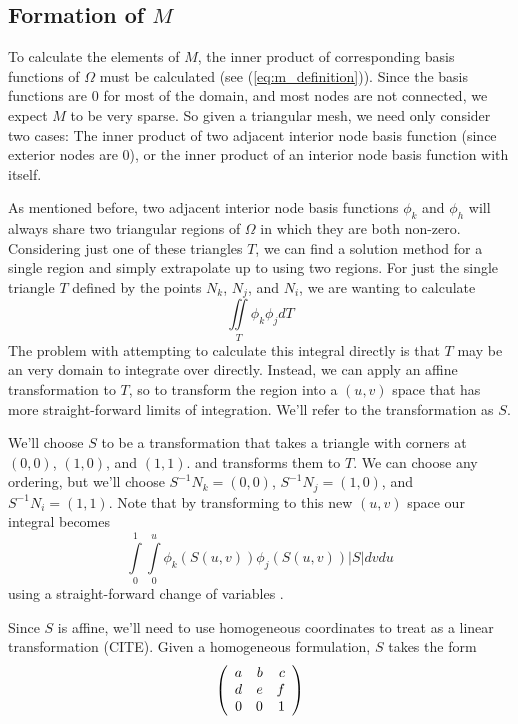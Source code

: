 \subsection{Formation of $M$}
To calculate the elements of $M$, the inner product of corresponding basis functions of $\Omega$ must be calculated
(see (\ref{eq:m_definition})). Since the basis functions are 0 for most of the domain, and most nodes are not
connected, we expect $M$ to be very sparse. So given a triangular mesh, we need only consider two cases: The inner
product of two adjacent interior node basis function (since exterior nodes are 0), or the inner product of an interior
node basis function with itself.

As mentioned before, two adjacent interior node basis functions $\phi_k$ and $\phi_h$ will always share two triangular
regions of $\Omega$ in which they are both non-zero. Considering just one of these triangles $T$, we can find a solution method for a
single region and simply extrapolate up to using two regions. For just the single triangle $T$ defined by the points
$N_k$, $N_j$, and $N_i$, we are wanting to calculate
\begin{equation}
\iint\limits_T \phi_k \phi_j dT
\end{equation}
The problem with attempting to calculate this integral directly is that $T$ may be an very domain to integrate over
directly. Instead, we can apply an affine transformation to $T$, so to transform the region into a $(u,v)$ space that
has more straight-forward limits of integration. We'll refer to the transformation as $S$.

We'll choose $S$ to be a transformation that takes a triangle with corners at $(0,0)$, $(1,0)$, and $(1,1)$. and
transforms them to $T$. We can choose any ordering, but we'll choose $S^{-1}N_k = (0, 0)$, $S^{-1}N_j = (1, 0)$,
and $S^{-1}N_i = (1, 1)$. Note that
by transforming to this new $(u,v)$ space our integral becomes
\begin{equation}
\int\limits_0^1 \int\limits_0^u \phi_k(S(u, v)) \phi_j(S(u, v)) |S| dv du
\end{equation}
using a straight-forward change of variables \cite{change_of_variables}.

Since $S$ is affine, we'll need to use homogeneous coordinates to treat as a linear transformation (CITE). Given a homogeneous
formulation, $S$ takes the form
\begin{equation}
\left(\begin{array}{rrrrrr}  a & b & c \\ d & e & f \\ 0 & 0 & 1  \\ \end{array} \right)
\end{equation}


